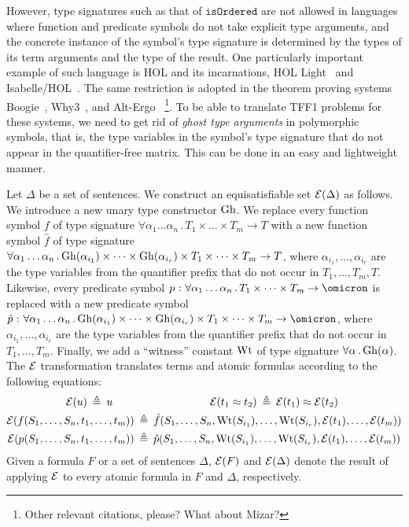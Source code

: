 However, type signatures such as that of $\mathtt{isOrdered}$ are not
allowed in languages where function and predicate symbols do not take
explicit type arguments, and the concrete instance of the symbol's type
signature is determined by the types of its term arguments and the type
of the result.
One particularly important example of such language is HOL
and its incarnations, HOL Light~\cite{harrison09hollight}
and Isabelle/HOL~\cite{NipkowPaulsonWenzel2002Isabelle}.
The same restriction is adopted in the theorem proving systems
Boogie~\cite{Barnett06boogie}, Why3~\cite{boogie11why3}, and
Alt-Ergo~\cite{conchon08smt}%
\footnote{Other relevant citations, please? What about Mizar?}.
To be able to translate TFF1 problems for these systems, we need
to get rid of {\em ghost type arguments} in polymorphic symbols,
that is, the type variables in the symbol's type signature that
do not appear in the quantifier-free matrix.
This can be done in an easy and lightweight manner.

Let $\Delta$ be a set of sentences.
We construct an equisatisfiable set $\mathcal{E}(\Delta)$ as follows.
%
We introduce a new unary type constructor $\mathrm{Gh}$.
We replace every function symbol $f$ of type signature
$\forall \alpha_1\dots\alpha_n \,.\, T_1 \times \dots \times T_m \to T$
with a new function symbol $\hat{f}$ of type signature
$\forall \alpha_1\dots\alpha_n \,.\,
\mathrm{Gh}(\alpha_{i_1}) \times \dots \times \mathrm{Gh}(\alpha_{i_r}) \times
T_1 \times \dots \times T_m \to T$,
where $\alpha_{i_1},\dots,\alpha_{i_r}$ are the type
variables from the quantifier prefix that do not occur in
$T_1,\dots,T_m,T$.
Likewise, every predicate symbol $p \,\ty\,
\forall \alpha_1\dots\alpha_n \,.\, T_1 \times \dots \times T_m \to \omicron$
is replaced with a new predicate symbol $\hat{p} \,\ty\,
\forall \alpha_1\dots\alpha_n \,.\,
\ghost(\alpha_{i_1}) \times \dots \times \ghost(\alpha_{i_r}) \times
T_1 \times \dots \times T_m \to \omicron$,
where $\alpha_{i_1},\dots,\alpha_{i_r}$ are the type
variables from the quantifier prefix that do not occur in
$T_1,\dots,T_m$.
Finally, we add a ``witness'' constant $\mathrm{Wt}$
of type signature $\forall \alpha\,.\,\mathrm{Gh}(\alpha)$.
The $\mathcal{E}$ transformation translates terms and atomic
formulas according to the following equations:
\begin{align*}
\mathcal{E}(u) \:\triangleq\: u
\quad\quad & \qquad\qquad\qquad\quad
\mathcal{E}(t_1 \approx t_2) \:\triangleq\: \mathcal{E}(t_1) \approx \mathcal{E}(t_2) \\
\mathcal{E}(f(S_1,\dots,S_n,t_1,\dots,t_m)) &\:\triangleq\:
\hat{f}(S_1,\dots,S_n,\mathrm{Wt}(S_{i_1}),\dots,\mathrm{Wt}(S_{i_r}),
\mathcal{E}(t_1),\dots,\mathcal{E}(t_m)) \\
\mathcal{E}(p(S_1,\dots,S_n,t_1,\dots,t_m)) &\:\triangleq\:
\hat{p}(S_1,\dots,S_n,\mathrm{Wt}(S_{i_1}),\dots,\mathrm{Wt}(S_{i_r}),
\mathcal{E}(t_1),\dots,\mathcal{E}(t_m))
\end{align*}
Given a formula $F$ or a set of sentences $\Delta$,
$\mathcal{E}(F)$ and $\mathcal{E}(\Delta)$ denote the result of
applying $\mathcal{E}$ to every atomic formula in $F$ and
$\Delta$, respectively.

